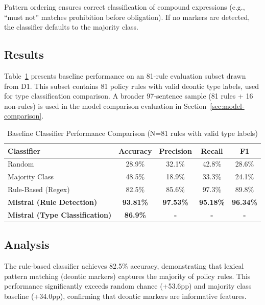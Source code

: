 Pattern ordering ensures correct classification of compound expressions (e.g., ``must not'' matches prohibition before obligation). If no markers are detected, the classifier defaults to the majority class.

\subsection{Results}

Table~\ref{tab:baseline-comparison} presents baseline performance on an 81-rule evaluation subset drawn from D1. This subset contains 81 policy rules with valid deontic type labels, used for type classification comparison. A broader 97-sentence sample (81 rules + 16 non-rules) is used in the model comparison evaluation in Section~\ref{sec:model-comparison}.

\begin{table}[htbp]
\centering
\caption{Baseline Classifier Performance Comparison (N=81 rules with valid type labels)}
\label{tab:baseline-comparison}
\begin{tabular}{lcccc}
\toprule
\textbf{Classifier} & \textbf{Accuracy} & \textbf{Precision} & \textbf{Recall} & \textbf{F1} \\
\midrule
Random              & 28.9\% & 32.1\% & 42.8\% & 28.6\% \\
Majority Class      & 48.5\% & 18.9\% & 33.3\% & 24.1\% \\
Rule-Based (Regex)  & 82.5\% & 85.6\% & 97.3\% & 89.8\% \\
\midrule
\textbf{Mistral (Rule Detection)} & \textbf{93.81\%} & \textbf{97.53\%} & \textbf{95.18\%} & \textbf{96.34\%} \\
\textbf{Mistral (Type Classification)} & \textbf{86.9\%} & \textbf{-} & \textbf{-} & \textbf{-} \\
\bottomrule
\end{tabular}
\end{table}

\subsection{Analysis}

The rule-based classifier achieves 82.5\% accuracy, demonstrating that lexical pattern matching (deontic markers) captures the majority of policy rules. This performance significantly exceeds random chance (+53.6pp) and majority class baseline (+34.0pp), confirming that deontic markers are informative features.

